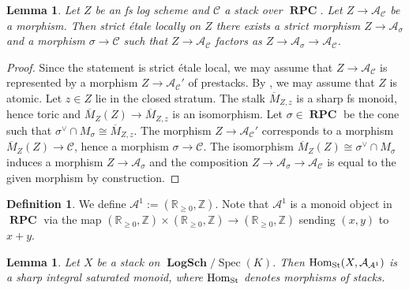 \documentclass[11pt]{amsart}
\newtheorem{lemma}[theorem]{Lemma}
\theoremstyle{definition}
\newtheorem{definition}[theorem]{Definition}
\theoremstyle{remark}
\DeclareMathOperator{\Spec}{Spec}
\DeclareMathOperator{\LogSch}{\mathbf{LogSch}}
\DeclareMathOperator{\RPC}{\mathbf{RPC}}
\DeclareMathOperator{\Hom}{\textup{Hom}}
\begin{document}
\begin{lemma}
	\label{lem:loc_factorization}
	Let $Z$ be an fs log scheme and $\mathcal{C}$ a stack over $\RPC$. Let $Z\to \mathcal{A}_{\mathcal{C}}$
	be a morphism. Then strict étale locally on $Z$
	there exists a strict morphism $Z\to \mathcal{A}_{\sigma}$ and a morphism $\sigma\to \mathcal{C}$
	such that $Z\to \mathcal{A}_{\mathcal{C}}$ factors as $Z\to \mathcal{A}_{\sigma}\to \mathcal{A}_{\mathcal{C}}$.
\end{lemma}

\begin{proof}
	Since the statement is strict étale local, we may assume that $Z\to \mathcal{A}_{\mathcal{C}}$ is represented by
	a morphism $Z\to \mathcal{A}_{\mathcal{C}}'$ of prestacks.
	By \cite[Proposition 2.2.2.5]{TheLogarithmicMolcho2022}, we may
	assume that $Z$ is atomic. Let $z\in Z$ lie in the closed stratum. The stalk $\overline{M}_{Z,z}$ is a sharp fs monoid, hence toric
	and $\overline{M}_Z(Z)\to \overline{M}_{Z,z}$ is an isomorphism. Let $\sigma\in \RPC$ be the cone such that
	$\sigma^{\vee}\cap M_{\sigma}\cong \overline{M}_{Z,z}$. The morphism $Z\to \mathcal{A}_{\mathcal{C}}'$
	corresponds to a morphism $\overline{M}_Z(Z)\to \mathcal{C}$, hence a morphism $\sigma\to \mathcal{C}$. The isomorphism
	$\overline{M}_Z(Z)\cong \sigma^{\vee}\cap M_{\sigma}$ induces a morphism $Z\to \mathcal{A}_{\sigma}$ and the composition
	$Z\to \mathcal{A}_{\sigma}\to \mathcal{A}_{\mathcal{C}}$ is equal to the given morphism by construction.
\end{proof}

\begin{definition}
	We define $\mathcal{A}^{1}:=(\mathbb{R}_{\ge 0},\mathbb{Z})$. Note
	that $\mathcal{A}^{1}$ is a monoid object in $\RPC$ via the map
	$(\mathbb{R}_{\ge 0},\mathbb{Z})\times(\mathbb{R}_{\ge 0},\mathbb{Z})\to
	(\mathbb{R}_{\ge 0},\mathbb{Z})$ sending $(x,y)$ to $x+y$.
\end{definition}

\begin{lemma}
	Let $X$ be a stack on $\LogSch/\Spec(K)$. Then
	$\Hom_{\mathrm{St}}(X,\mathcal{A}_{\mathcal{A}^{1}})$ is a sharp integral saturated monoid,
	where $\Hom_{\mathrm{St}}$ denotes morphisms of stacks.
\end{lemma}
\end{document}
